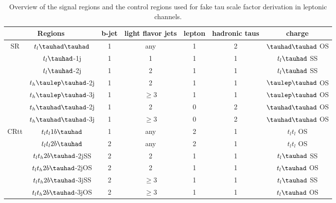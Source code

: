 \begin{table}
\centering
\caption{Overview of the signal regions and the control regions used for fake tau scale factor derivation in leptonic channels.}
\label{tab:srcr}
\begin{tabular}[h]{c|c|c|c|c|c|c}
\hline \hline
\multicolumn{2}{c|}{Regions} & b-jet & light flavor jets        & lepton & hadronic taus & charge\\ \hline
\multirow{7}{*}{SR}&$t_l\thadhad$     & 1     & any                                & 1      & 2             & $\thadhad$ OS\\ \cline{2-7}
&$t_l\tauhad$-1j  & 1     & 1                                   & 1      & 1                     & $t_l\tauhad$ SS\\ \cline{2-7}
&$t_l\tauhad$-2j  & 1     & 2                                        & 1      & 1                     & $t_l\tauhad$ SS\\ \cline{2-7}
&$t_h\tlhad$-2j   & 1     & 2                           & 1      & 1             & $\tlhad$ OS\\ \cline{2-7}
&$t_h\tlhad$-3j   & 1     & $\ge3$                      & 1      & 1             & $\tlhad$ OS\\ \cline{2-7}
&$t_h\thadhad$-2j & 1     & 2                            & 0      & 2             & $\thadhad$ OS\\ \cline{2-7}
&$t_h\thadhad$-3j & 1     & $\ge3$                       & 0      & 2             & $\thadhad$ OS\\ \hline
\multirow{6}{*}{CRtt}&$t_lt_l1b\tauhad$ & 1     & any                           & 2      & 1                     & $t_lt_l$ OS\\ \cline{2-7}
&$t_lt_l2b\tauhad$      & 2     & any                           & 2      & 1                     & $t_lt_l$ OS\\ \cline{2-7}
&$t_lt_h2b\tauhad$-2jSS & 2     & 2                             & 1      & 1             & $t_l\tauhad$ SS\\ \cline{2-7}
&$t_lt_h2b\tauhad$-2jOS & 2     & 2                             & 1      & 1             & $t_l\tauhad$ OS\\ \cline{2-7}
&$t_lt_h2b\tauhad$-3jSS & 2     & $\ge3$                        & 1      & 1             & $t_l\tauhad$ SS\\ \cline{2-7}
&$t_lt_h2b\tauhad$-3jOS & 2     & $\ge3$                & 1      & 1             & $t_l\tauhad$ OS\\ \hline
\end{tabular}
\end{table}

